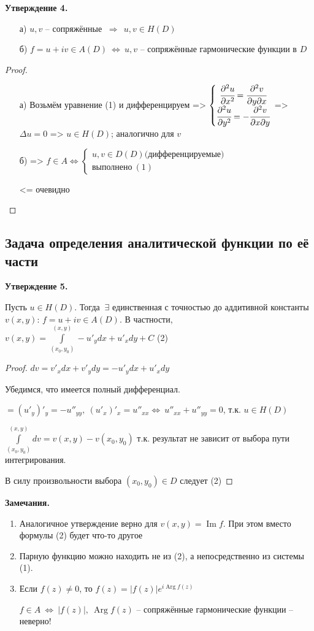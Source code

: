 \documentclass[final]{report}
\newcommand{\dd}{\partial}
\newcommand{\then}{\ \Rightarrow\ }
\newcommand{\mint}[2]{\underset{#1}{\overset{#2}{\int}}}
\newcommand{\LRA}{\Leftrightarrow}
\renewcommand{\Im}{\mathop{\mathrm{Im}}\nolimits}
\newcommand{\Arg}{\mathop{\mathrm{Arg}}\nolimits}
\newcommand{\D}{\Delta}
\newcommand{\E}{\ \exists}
\newcommand{\sys}[1]{\left\{\begin{matrix}#1\end{matrix}\right.}
\theoremstyle{remark}
\begin{document}
{\bfseries Утверждение 4.}
\begin{itemize}
\item[а)] $u,v$ -- сопряжённые $\then\ u,v\in H(D)$
\item[б)] $f=u+iv\in A(D)\ \LRA\ u,v$ -- сопряжённые гармонические функции в $D$
\end{itemize}

\begin{proof}
\begin{itemize}
\item[а)] Возьмём уравнение (1) и дифференцируем =>
$\sys{\cfrac{\dd^2u}{\dd x^2}=\cfrac{\dd^2v}{\dd y\dd x} \\ \cfrac{\dd^2u}{\dd y^2}=-\cfrac{\dd^2v}{\dd x\dd y}}$
 => $\D u=0$ => $u\in H(D)$; аналогично для $v$
\item[б)] => $f\in A\LRA \sys{u,v\in D(D) \mbox{(дифференцируемые)} \\ \mbox{выполнено}\ (1)}$

<= очевидно
\end{itemize}
\end{proof}

\subsection{Задача определения аналитической функции по её части}

{\bfseries Утверждение 5.}

Пусть $u\in H(D)$. Тогда $\E$ единственная с точностью до аддитивной константы $v(x,y)$: $f=u+iv\in A(D)$. В частности, $v(x,y)=\mint{(x_0,y_0)}{(x,y)}-u'_ydx+u'_xdy+C$ (2)

\begin{proof}
$dv=v'_xdx+v'_ydy=-u'_ydx+u'_xdy$

Убедимся, что имеется полный дифференциал.

$=(u'_y)'_y=-u''_{yy},\ (u'_x)'_x=u''_{xx} \LRA\ u''_{xx}+u''_{yy}=0$, т.к. $u\in H(D)$

$\mint{(x_0,y_0)}{(x,y)}dv=v(x,y)-v(x_0,y_0)$ т.к. результат не зависит от выбора пути интегрирования.

В силу произвольности выбора $(x_0,y_0)\in D$ следует (2)
\end{proof}

{\bfseries Замечания.}
\begin{enumerate}
\item Аналогичное утверждение верно для $v(x,y)=\Im f$. При этом вместо формулы (2) будет что-то другое
\item Парную функцию можно находить не из (2), а непосредственно из системы (1).
\item Если $f(z)\neq 0$, то $f(z)=|f(z)|e^{i\Arg f(z)}$

$f\in A\ \LRA\ |f(z)|,\ \Arg f(z)$ -- сопряжённые гармонические функции -- неверно!
\end{enumerate}
\end{document}
